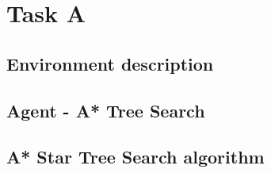 
\chapter{Task A}
\section{Environment description}


\section{Agent - A* Tree Search}


\section{A* Star Tree Search algorithm}


